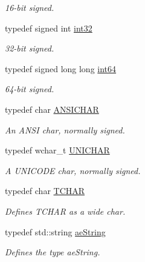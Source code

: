 \begin{DoxyCompactItemize}
\begin{DoxyCompactList}\small\item\em 16-\/bit signed. \end{DoxyCompactList}\item 
typedef signed int \hyperlink{namespaceae_core_a862bc39eb87cfabca273f49e2a920129}{int32}\hypertarget{namespaceae_core_a862bc39eb87cfabca273f49e2a920129}{}\label{namespaceae_core_a862bc39eb87cfabca273f49e2a920129}

\begin{DoxyCompactList}\small\item\em 32-\/bit signed. \end{DoxyCompactList}\item 
typedef signed long long \hyperlink{namespaceae_core_aa97dc55535090f470938e38f4c1592b5}{int64}\hypertarget{namespaceae_core_aa97dc55535090f470938e38f4c1592b5}{}\label{namespaceae_core_aa97dc55535090f470938e38f4c1592b5}

\begin{DoxyCompactList}\small\item\em 64-\/bit signed. \end{DoxyCompactList}\item 
typedef char \hyperlink{namespaceae_core_a33e0245ce11ed6c2fb08d03f342d07e6}{A\+N\+S\+I\+C\+H\+AR}\hypertarget{namespaceae_core_a33e0245ce11ed6c2fb08d03f342d07e6}{}\label{namespaceae_core_a33e0245ce11ed6c2fb08d03f342d07e6}

\begin{DoxyCompactList}\small\item\em An A\+N\+SI char, normally signed. \end{DoxyCompactList}\item 
typedef wchar\+\_\+t \hyperlink{namespaceae_core_af3736ff30e300b0b87681b5e1d11d1fd}{U\+N\+I\+C\+H\+AR}\hypertarget{namespaceae_core_af3736ff30e300b0b87681b5e1d11d1fd}{}\label{namespaceae_core_af3736ff30e300b0b87681b5e1d11d1fd}

\begin{DoxyCompactList}\small\item\em A U\+N\+I\+C\+O\+DE char, normally signed. \end{DoxyCompactList}\item 
typedef char \hyperlink{namespaceae_core_a052c557709e5ab43db521b23085fd916}{T\+C\+H\+AR}\hypertarget{namespaceae_core_a052c557709e5ab43db521b23085fd916}{}\label{namespaceae_core_a052c557709e5ab43db521b23085fd916}

\begin{DoxyCompactList}\small\item\em Defines T\+C\+H\+AR as a wide char. \end{DoxyCompactList}\item 
typedef std\+::string \hyperlink{namespaceae_core_ad6f85aacc0d1fdd85e458e2413e60010}{ae\+String}\hypertarget{namespaceae_core_ad6f85aacc0d1fdd85e458e2413e60010}{}\label{namespaceae_core_ad6f85aacc0d1fdd85e458e2413e60010}

\begin{DoxyCompactList}\small\item\em Defines the type ae\+String. \end{DoxyCompactList}\end{DoxyCompactItemize}
